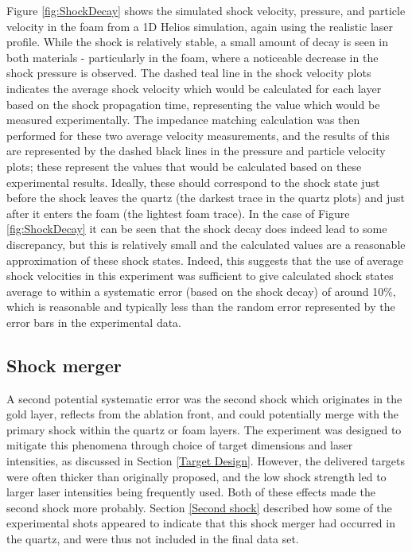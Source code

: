Figure \ref{fig:ShockDecay} shows the simulated shock velocity, pressure, and particle velocity in the foam from a 1D Helios simulation, again using the realistic laser profile. While the shock is relatively stable, a small amount of decay is seen in both materials - particularly in the foam, where a noticeable decrease in the shock pressure is observed. The dashed teal line in the shock velocity plots indicates the average shock velocity which would be calculated for each layer based on the shock propagation time, representing the value which would be measured experimentally. The impedance matching calculation was then performed for these two average velocity measurements, and the results of this are represented by the dashed black lines in the pressure and particle velocity plots; these represent the values that would be calculated based on these experimental results. Ideally, these should correspond to the shock state just before the shock leaves the quartz (the darkest trace in the quartz plots) and just after it enters the foam (the lightest foam trace). In the case of Figure \ref{fig:ShockDecay} it can be seen that the shock decay does indeed lead to some discrepancy, but this is relatively small and the calculated values are a reasonable approximation of these shock states. Indeed, this suggests that the use of average shock velocities in this experiment was sufficient to give calculated shock states average to within a systematic error (based on the shock decay) of around 10\%, which is reasonable and typically less than the random error represented by the error bars in the experimental data.

\subsection{Shock merger} \label{Shock merger}

A second potential systematic error was the second shock which originates in the gold layer, reflects from the ablation front, and could potentially merge with the primary shock within the quartz or foam layers. The experiment was designed to mitigate this phenomena through choice of target dimensions and laser intensities, as discussed in Section \ref{Target Design}. However, the delivered targets were often thicker than originally proposed, and the low shock strength led to larger laser intensities being frequently used. Both of these effects made the second shock more probably. Section \ref{Second shock} described how some of the experimental shots appeared to indicate that this shock merger had occurred in the quartz, and were thus not included in the final data set.

